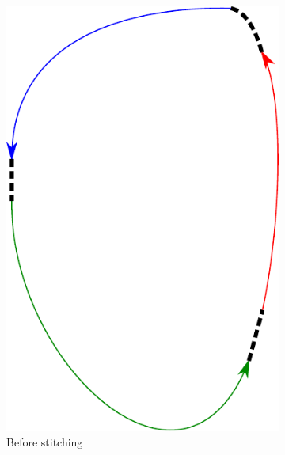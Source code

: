 \documentclass[fontsize=9pt,twocolumns,enabledeprecatedfontcommands]{scrartcl}
\begin{document}
\begin{figure}
	
	\begin{subfigure}{0.5\textwidth}
		
		\centering
		\includegraphics[angle=90,width=0.9\linewidth,height=0.15\textheight]{stitch1}
		\caption{Before stitching}
		\label{stitch1}
		
	\end{subfigure}
	\vspace{2em}
	\begin{subfigure}{0.5\textwidth}
		

\end{subfigure}
\end{figure}
\end{document}
